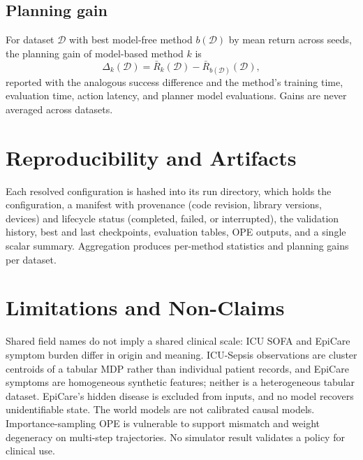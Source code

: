 \documentclass[10pt,twocolumn]{article}
\newcommand{\dataset}{\mathcal{D}}
\begin{document}
\subsection{Planning gain}

For dataset $\dataset$ with best model-free method $b(\dataset)$ by mean return across seeds, the planning gain of model-based method $k$ is
\begin{equation}
 \Delta_k(\dataset)=\bar R_k(\dataset)-\bar R_{b(\dataset)}(\dataset),
\end{equation}
reported with the analogous success difference and the method's training time, evaluation time, action latency, and planner model evaluations. Gains are never averaged across datasets.

\section{Reproducibility and Artifacts}
\label{sec:artifacts}

Each resolved configuration is hashed into its run directory, which holds the configuration, a manifest with provenance (code revision, library versions, devices) and lifecycle status (completed, failed, or interrupted), the validation history, best and last checkpoints, evaluation tables, OPE outputs, and a single scalar summary. Aggregation produces per-method statistics and planning gains per dataset.

\section{Limitations and Non-Claims}
\label{sec:limitations}

Shared field names do not imply a shared clinical scale: ICU SOFA and EpiCare symptom burden differ in origin and meaning. ICU-Sepsis observations are cluster centroids of a tabular MDP rather than individual patient records, and EpiCare symptoms are homogeneous synthetic features; neither is a heterogeneous tabular dataset. EpiCare's hidden disease is excluded from inputs, and no model recovers unidentifiable state. The world models are not calibrated causal models. Importance-sampling OPE is vulnerable to support mismatch and weight degeneracy on multi-step trajectories. No simulator result validates a policy for clinical use.
\end{document}
